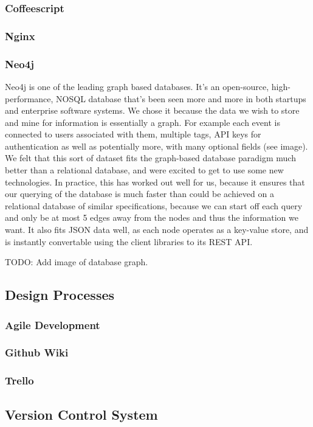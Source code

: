 \documentclass[11pt]{article}
\begin{document}
\subsubsection {Coffeescript}
\subsubsection {Nginx}
\subsubsection {Neo4j}

Neo4j is one of the leading graph based databases. It's an open-source, high-performance, NOSQL database that's been seen more and more in both startups and enterprise software systems. We chose it because the data we wish to store and mine for information is essentially a graph. For example each event is connected to users associated with them, multiple tags, API keys for authentication as well as potentially more, with many optional fields (see image). We felt that this sort of dataset fits the graph-based database paradigm much better than a relational database, and were excited to get to use some new technologies. In practice, this has worked out well for us, because it ensures that our querying of the database is much faster than could be achieved on a relational database of similar specifications, because we can start off each query and only be at most 5 edges away from the nodes and thus the information we want. It also fits JSON data well, as each node operates as a key-value store, and is instantly convertable using the client libraries to its REST API.

TODO: Add image of database graph.
\subsection {Design Processes}

\subsubsection {Agile Development}
\subsubsection {Github Wiki}
\subsubsection {Trello}

\subsection {Version Control System}
\end{document}
